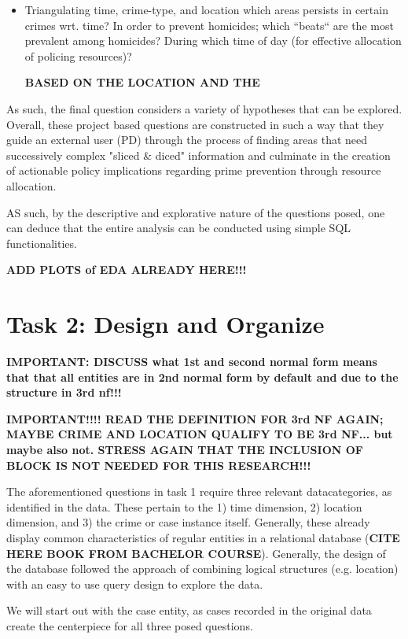 \documentclass[a4paper]{article}
\begin{document}
\begin{itemize}
  \item Triangulating time, crime-type, and location which areas persists in certain crimes wrt. time?
In order to prevent homicides; which “beats“ are the most prevalent among homicides? During which time of day (for effective allocation of policing resources)? 

\textbf{BASED ON THE LOCATION AND THE }
\end{itemize}

As such, the final question considers a variety of hypotheses that can be explored. Overall, these project based questions are constructed in such a way that they guide an external user (PD) through the process of finding areas that need successively complex "sliced \& diced" information and culminate in the creation of actionable policy implications regarding prime prevention through resource allocation.

AS such, by the descriptive and explorative nature of the questions posed, one can deduce that the entire analysis can be conducted using simple SQL functionalities.

\textbf{ADD PLOTS of EDA ALREADY HERE!!!}


\section{Task 2: Design and Organize}
\textbf{IMPORTANT: DISCUSS what 1st and second normal form means that that all entities are in 2nd normal form by default and due to the structure in 3rd nf!!!}


\textbf{IMPORTANT!!!! READ THE DEFINITION FOR 3rd NF AGAIN; MAYBE CRIME AND LOCATION QUALIFY TO BE 3rd NF... but maybe also not. STRESS AGAIN THAT THE INCLUSION OF BLOCK IS NOT NEEDED FOR THIS RESEARCH!!!}

The aforementioned questions in task 1 require three relevant datacategories, as identified in the data. These pertain to the 1) time dimension, 2) location dimension, and 3) the crime or case instance itself. Generally, these already display common characteristics of regular entities in a relational database (\textbf{CITE HERE BOOK FROM BACHELOR COURSE}). Generally, the design of the database followed the approach of combining logical structures (e.g. location) with an easy to use query design to explore the data.

We will start out with the case entity, as cases recorded in the original data create the centerpiece for all three posed questions.
\end{document}
